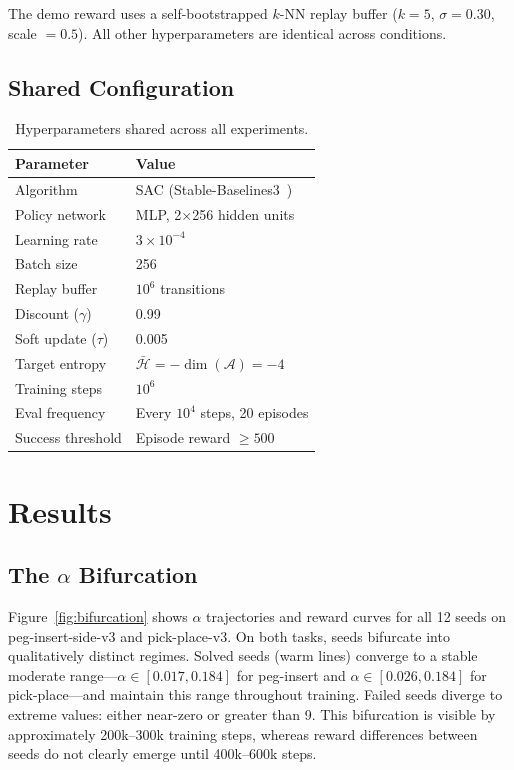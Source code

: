 \documentclass[twocolumn]{article}
\begin{document}
The demo reward uses a self-bootstrapped $k$-NN replay buffer
($k{=}5$, $\sigma{=}0.30$, scale $= 0.5$). All other hyperparameters are
identical across conditions.

\subsection{Shared Configuration}

\begin{table}[h]
\caption{Hyperparameters shared across all experiments.}
\label{tab:hyperparams}
\centering
\small
\begin{tabular}{ll}
\toprule
Parameter & Value \\
\midrule
Algorithm           & SAC (Stable-Baselines3~\citep{raffin2021}) \\
Policy network      & MLP, 2$\times$256 hidden units \\
Learning rate       & $3 \times 10^{-4}$ \\
Batch size          & 256 \\
Replay buffer       & $10^6$ transitions \\
Discount ($\gamma$) & 0.99 \\
Soft update ($\tau$) & 0.005 \\
Target entropy      & $\bar{\mathcal{H}} = -\dim(\mathcal{A}) = -4$ \\
Training steps      & $10^6$ \\
Eval frequency      & Every $10^4$ steps, 20 episodes \\
Success threshold   & Episode reward $\geq 500$ \\
\bottomrule
\end{tabular}
\end{table}


\section{Results}
\label{sec:results}

\subsection{The $\alpha$ Bifurcation}
\label{sec:bifurcation}

Figure~\ref{fig:bifurcation} shows $\alpha$ trajectories and reward curves for
all 12 seeds on peg-insert-side-v3 and pick-place-v3. On both tasks, seeds
bifurcate into qualitatively distinct regimes. Solved seeds (warm lines) converge
to a stable moderate range---$\alpha \in [0.017, 0.184]$ for peg-insert and
$\alpha \in [0.026, 0.184]$ for pick-place---and maintain this range throughout
training. Failed seeds diverge to extreme values: either near-zero or greater
than 9. This bifurcation is visible by approximately 200k--300k training steps,
whereas reward differences between seeds do not clearly emerge until 400k--600k
steps.
\end{document}
